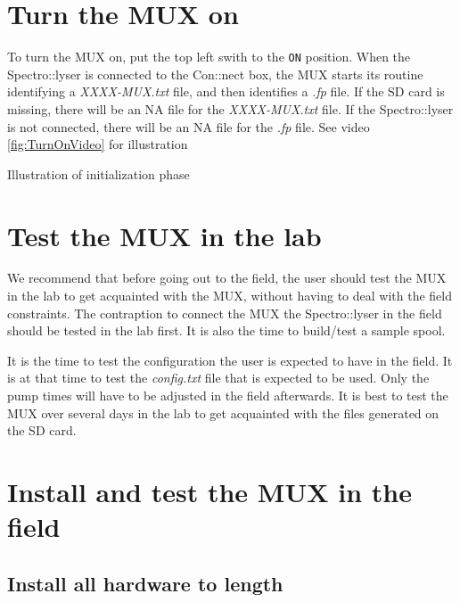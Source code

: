 \documentclass[]{book}
\begin{document}
\hypertarget{turn-the-mux-on}{%
\section{Turn the MUX on}\label{turn-the-mux-on}}

To turn the MUX on, put the top left swith to the \texttt{ON} position. When the Spectro::lyser is connected to the Con::nect box, the MUX starts its routine identifying a \emph{XXXX-MUX.txt} file, and then identifies a \emph{.fp} file. If the SD card is missing, there will be an NA file for the \emph{XXXX-MUX.txt} file. If the Spectro::lyser is not connected, there will be an NA file for the \emph{.fp} file. See video \ref{fig:TurnOnVideo} for illustration

\label{fig:TurnOnVideo}Illustration of initialization phase

\hypertarget{test-the-mux-in-the-lab}{%
\section{Test the MUX in the lab}\label{test-the-mux-in-the-lab}}

We recommend that before going out to the field, the user should test the MUX in the lab to get acquainted with the MUX, without having to deal with the field constraints. The contraption to connect the MUX the Spectro::lyser in the field should be tested in the lab first. It is also the time to build/test a sample spool.

It is the time to test the configuration the user is expected to have in the field. It is at that time to test the \emph{config.txt} file that is expected to be used. Only the pump times will have to be adjusted in the field afterwards. It is best to test the MUX over several days in the lab to get acquainted with the files generated on the SD card.

\hypertarget{install-and-test-the-mux-in-the-field}{%
\section{Install and test the MUX in the field}\label{install-and-test-the-mux-in-the-field}}

\hypertarget{install-all-hardware-to-length}{%
\subsection{Install all hardware to length}\label{install-all-hardware-to-length}}
\end{document}
